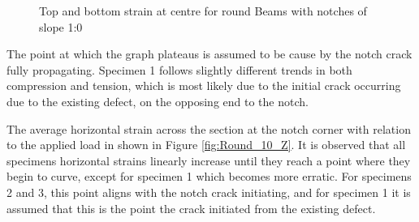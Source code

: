 \documentclass[11pt,a4paper]{article}
\numberwithin{equation}{subsection}
\begin{document}
\begin{figure}[h]
	\begin{center}
	\end{center}
	\caption{Top and bottom strain at centre for round Beams with notches of slope 1:0}
	\label{fig:Round_10_Centre}
\end{figure}
\pagebreak
\noindent
The point at which the graph plateaus is assumed to be cause by the notch crack fully propagating. Specimen 1 follows slightly different trends in both compression and tension, which is most likely due to the initial crack occurring due to the existing defect, on the opposing end to the notch.

\vspace*{\baselineskip}

\noindent
The average horizontal strain across the section at the notch corner with relation to the applied load in shown in Figure \ref{fig:Round_10_Z}. It is observed that all specimens horizontal strains linearly increase until they reach a point where they begin to curve, except for specimen 1 which becomes more erratic. For specimens 2 and 3, this point aligns with the notch crack initiating, and for specimen 1 it is assumed that this is the point the crack initiated from the existing defect. 
\end{document}
